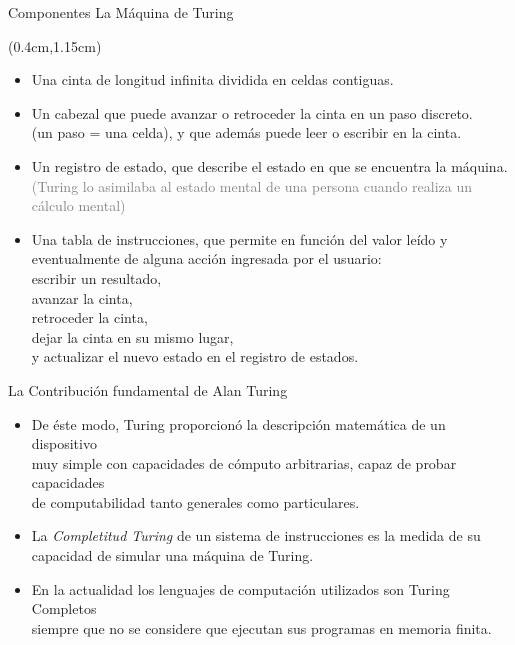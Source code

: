 \documentclass[table,dvipsnames,aspectratio=169]{beamer}
\begin{document}
\begin{frame}{Componentes La Máquina de Turing}
 \begin{textblock*}{\textwidth}(0.4cm,1.15cm)
  \begin{itemize}[<+->] \justifying
   \item Una \textcolor{furfiBlue}{cinta} de longitud infinita dividida en celdas contiguas.
   \item Un \textcolor{furfiBlue}{cabezal} que puede avanzar o retroceder la cinta en un paso discreto.\\
   (un paso = una celda), y que además puede leer o escribir en la cinta.
   \item Un \textcolor{furfiBlue}{registro de estado}, que describe el estado en que se encuentra la máquina.\\
   {\textcolor{Gray}{\small (Turing lo asimilaba al estado mental de una persona cuando realiza un cálculo mental)}}
   \item Una \textcolor{furfiBlue}{tabla de instrucciones}, que permite en función del valor leído y eventualmente de alguna acción ingresada por el usuario:\\
   \hspace{1cm} escribir un resultado,\\
   \hspace{1cm} avanzar la cinta,\\
   \hspace{1cm} retroceder la cinta,\\
   \hspace{1cm} dejar la cinta en su mismo lugar,\\
   \hspace{1cm} y actualizar el nuevo estado en el registro de estados.
  \end{itemize}
 \end{textblock*}
\end{frame}

\begin{frame}{La Contribución fundamental de Alan Turing}
  \begin{itemize}[<+->] \setlength{\itemsep}{6mm}
   \item De éste modo, Turing proporcionó la descripción matemática de un \textcolor{furfiBlue}{dispositivo}\\
   muy simple con capacidades de \textcolor{furfiBlue}{cómputo arbitrarias}, capaz de probar capacidades\\
   de computabilidad tanto generales como particulares.
   \item La \textcolor{furfiBlue}{\textit{Completitud Turing}} de un sistema de instrucciones es la medida de su\\
   capacidad de simular una máquina de Turing.
   \item En la actualidad los lenguajes de computación utilizados son \textcolor{furfiBlue}{Turing Completos}\\
   siempre que no se considere que ejecutan sus programas en memoria finita.
  \end{itemize}
\end{frame}
\end{document}
